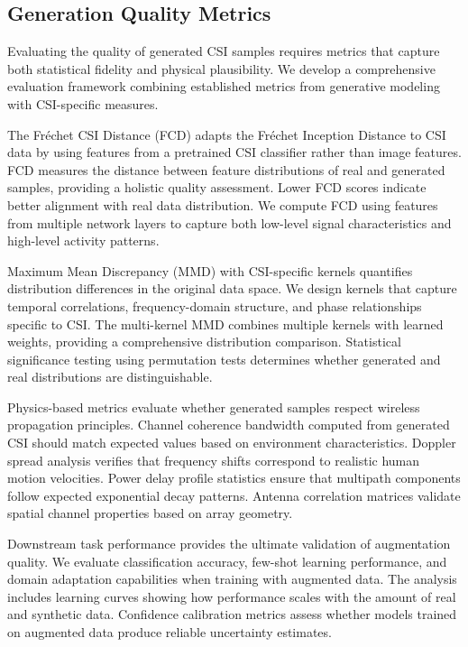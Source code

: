 \documentclass[journal]{IEEEtran}
\begin{document}
\subsection{Generation Quality Metrics}

Evaluating the quality of generated CSI samples requires metrics that capture both statistical fidelity and physical plausibility. We develop a comprehensive evaluation framework combining established metrics from generative modeling with CSI-specific measures.

The Fréchet CSI Distance (FCD) adapts the Fréchet Inception Distance to CSI data by using features from a pretrained CSI classifier rather than image features. FCD measures the distance between feature distributions of real and generated samples, providing a holistic quality assessment. Lower FCD scores indicate better alignment with real data distribution. We compute FCD using features from multiple network layers to capture both low-level signal characteristics and high-level activity patterns.

Maximum Mean Discrepancy (MMD) with CSI-specific kernels quantifies distribution differences in the original data space. We design kernels that capture temporal correlations, frequency-domain structure, and phase relationships specific to CSI. The multi-kernel MMD combines multiple kernels with learned weights, providing a comprehensive distribution comparison. Statistical significance testing using permutation tests determines whether generated and real distributions are distinguishable.

Physics-based metrics evaluate whether generated samples respect wireless propagation principles. Channel coherence bandwidth computed from generated CSI should match expected values based on environment characteristics. Doppler spread analysis verifies that frequency shifts correspond to realistic human motion velocities. Power delay profile statistics ensure that multipath components follow expected exponential decay patterns. Antenna correlation matrices validate spatial channel properties based on array geometry.

Downstream task performance provides the ultimate validation of augmentation quality. We evaluate classification accuracy, few-shot learning performance, and domain adaptation capabilities when training with augmented data. The analysis includes learning curves showing how performance scales with the amount of real and synthetic data. Confidence calibration metrics assess whether models trained on augmented data produce reliable uncertainty estimates.
\end{document}
